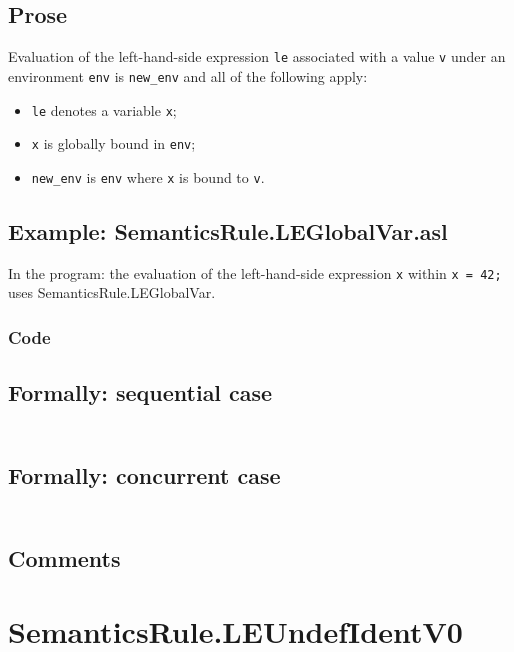 \documentclass{book}
\begin{document}
    \subsection{Prose}
    Evaluation of the left-hand-side expression \texttt{le} associated with a
value \texttt{v} under an environment \texttt{env} is \texttt{new\_env} and all
of the following apply:
    \begin{itemize}
    \item \texttt{le} denotes a variable \texttt{x};
    \item \texttt{x} is globally bound in \texttt{env};
    \item \texttt{new\_env} is \texttt{env} where \texttt{x} is bound to \texttt{v}.
    \end{itemize}

    \subsection{Example: SemanticsRule.LEGlobalVar.asl}
    In the program:
    the evaluation of the left-hand-side expression \texttt{x} within \texttt{x = 42;} uses SemanticsRule.LEGlobalVar.

  \subsubsection{Code}

  \subsection{Formally: sequential case}
  \begin{align}
  \end{align} 

  \subsection{Formally: concurrent case}
  \begin{align}
  \end{align} 

    \subsection{Comments}

\section{SemanticsRule.LEUndefIdentV0 \label{sec:SemanticsRule.LEUndefIdentV0}}
\end{document}
